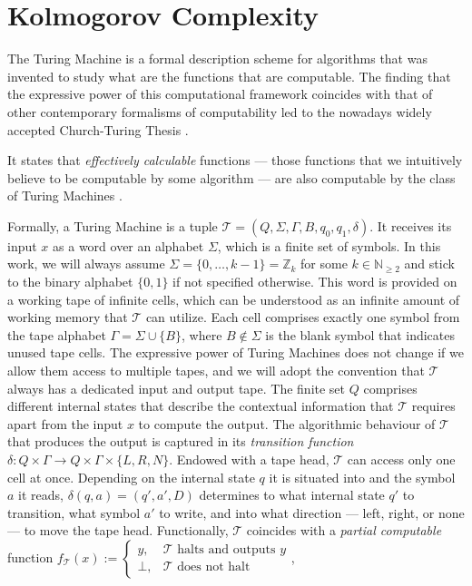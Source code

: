 \section{Kolmogorov Complexity}
\label{sec:kolmogorov-complexity}
The Turing Machine is a formal description scheme for algorithms that was invented to study what are the functions that are computable.
The finding that the expressive power of this computational framework coincides with that of other contemporary formalisms of computability led to the nowadays widely accepted Church-Turing Thesis \cite{turing1936computable}\cite{turing1937computability}.

It states that \textit{effectively calculable} functions --- those functions that we intuitively believe to be computable by some algorithm --- are also computable by the class of Turing Machines \cite{turing2004intelligent}.

Formally, a Turing Machine is a tuple $\mathcal{T}=(Q,\Sigma,\Gamma,B,q_0,q_1,\delta)$.
It receives its input $x$ as a word over an alphabet $\Sigma$, which is a finite set of symbols. 
In this work, we will always assume $\Sigma=\{0,\dots,k-1\}=\mathbb{Z}_k$ for some $k\in\mathbb{N}_{\geq 2}$ and stick to the binary alphabet $\{0,1\}$ if not specified otherwise.
This word is provided on a working tape of infinite cells, which can be understood as an infinite amount of working memory that $\mathcal{T}$ can utilize. Each cell comprises exactly one symbol from the tape alphabet $\Gamma=\Sigma\cup\{B\}$, where $B\notin\Sigma$ is the blank symbol that indicates unused tape cells.
The expressive power of Turing Machines does not change if we allow them access to multiple tapes, and we will adopt the convention that $\mathcal{T}$ always has a dedicated input and output tape.
The finite set $Q$ comprises different internal states that describe the contextual information that $\mathcal{T}$ requires apart from the input $x$ to compute the output. 
The algorithmic behaviour of $\mathcal{T}$ that produces the output is captured in its \textit{transition function} $\delta:Q\times \Gamma \to Q \times \Gamma \times \{L,R,N\}$.
Endowed with a tape head, $\mathcal{T}$ can access only one cell at once. 
Depending on the internal state $q$ it is situated into and the symbol $a$ it reads, $\delta(q,a)=(q',a',D)$ determines to what internal state $q'$ to transition, what symbol $a'$ to write, and into what direction --- left, right, or none --- to move the tape head.
Functionally, $\mathcal{T}$ coincides with a \textit{partial computable} function $f_{\mathcal{T}}(x):=\begin{cases}
	y, & \mathcal{T} \text{ halts and outputs } y\\
	\bot, & \mathcal{T} \text{ does not halt}
\end{cases}$,

